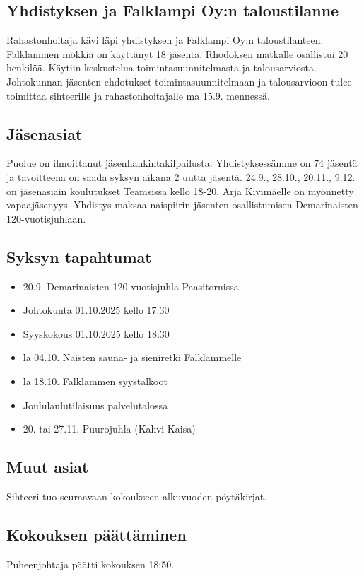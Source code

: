 \documentclass[a4paper,12pt]{article}
\begin{document}
\subsection{Yhdistyksen ja Falklampi Oy:n taloustilanne}
Rahastonhoitaja kävi läpi yhdistyksen ja Falklampi Oy:n taloustilanteen. Falklammen mökkiä on käyttänyt 18 jäsentä. Rhodoksen matkalle osallistui 20 henkilöä. Käytiin keskustelua toimintasuunnitelmasta ja talousarviosta. Johtokunnan jäsenten ehdotukset toimintasuunnitelmaan ja talousarvioon tulee toimittaa sihteerille ja rahastonhoitajalle ma 15.9. mennessä.
\subsection{Jäsenasiat}
Puolue on ilmoittanut jäsenhankintakilpailusta. Yhdistyksessämme on 74 jäsentä ja tavoitteena on saada syksyn aikana 2 uutta jäsentä. 24.9., 28.10., 20.11., 9.12. on jäsenasiain koulutukset Teamsissa kello 18-20. Arja Kivimäelle on myönnetty vapaajäsenyys. Yhdistys maksaa naispiirin jäsenten osallistumisen Demarinaisten 120-vuotisjuhlaan.
\subsection{Syksyn tapahtumat}
\begin{itemize}
\item{20.9. Demarinaisten 120-vuotisjuhla Paasitornissa}
\item{Johtokunta 01.10.2025 kello 17:30}
\item{Syyskokous 01.10.2025 kello 18:30}
\item{la 04.10. Naisten sauna- ja sieniretki Falklammelle}
\item{la 18.10. Falklammen syystalkoot}
\item{Joululaulutilaisuus palvelutalossa}
\item{20. tai 27.11. Puurojuhla (Kahvi-Kaisa)}
\end{itemize}
\subsection{Muut asiat}
Sihteeri tuo seuraavaan kokoukseen alkuvuoden pöytäkirjat.
\subsection{Kokouksen päättäminen}
Puheenjohtaja päätti kokouksen 18:50.
\end{document}
